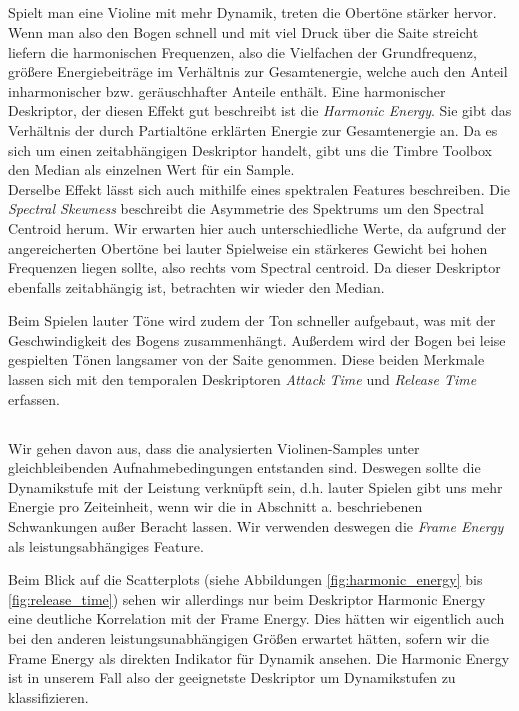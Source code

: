 \subsection{}
Spielt man eine Violine mit mehr Dynamik, treten die Obertöne stärker hervor.
Wenn man also den Bogen schnell und mit viel Druck über die Saite streicht liefern die harmonischen Frequenzen, also die Vielfachen der Grundfrequenz, größere Energiebeiträge im Verhältnis zur Gesamtenergie, welche auch den Anteil inharmonischer bzw. geräuschhafter Anteile enthält.  
Eine harmonischer Deskriptor, der diesen Effekt gut beschreibt ist die \textit{Harmonic Energy}.
Sie gibt das Verhältnis der durch Partialtöne erklärten Energie zur Gesamtenergie an.
Da es sich um einen zeitabhängigen Deskriptor handelt, gibt uns die Timbre Toolbox den Median als einzelnen Wert für ein Sample.\\ 
Derselbe Effekt lässt sich auch mithilfe eines spektralen Features beschreiben.
Die \textit{Spectral Skewness} beschreibt die Asymmetrie des Spektrums um den Spectral Centroid herum.
Wir erwarten hier auch unterschiedliche Werte, da aufgrund der angereicherten Obertöne bei lauter Spielweise ein stärkeres Gewicht bei hohen Frequenzen liegen sollte, also rechts vom Spectral centroid.
Da dieser Deskriptor ebenfalls zeitabhängig ist, betrachten wir wieder den Median.

Beim Spielen lauter Töne wird zudem der Ton schneller aufgebaut, was mit der Geschwindigkeit des Bogens zusammenhängt.
Außerdem wird der Bogen bei leise gespielten Tönen langsamer von der Saite genommen.
Diese beiden Merkmale lassen sich mit den temporalen Deskriptoren \textit{Attack Time} und \textit{Release Time} erfassen.

\subsection{}
Wir gehen davon aus, dass die analysierten Violinen-Samples unter gleichbleibenden Aufnahmebedingungen entstanden sind. 
Deswegen sollte die Dynamikstufe mit der Leistung verknüpft sein, d.h. lauter Spielen gibt uns mehr Energie pro Zeiteinheit, wenn wir die in Abschnitt a. beschriebenen Schwankungen außer Beracht lassen.
Wir verwenden deswegen die \textit{Frame Energy} als leistungsabhängiges Feature.

Beim Blick auf die Scatterplots (siehe Abbildungen \ref{fig:harmonic_energy} bis \ref{fig:release_time}) sehen wir allerdings nur beim Deskriptor Harmonic Energy eine deutliche Korrelation mit der Frame Energy. 
Dies hätten wir eigentlich auch bei den anderen leistungsunabhängigen Größen erwartet hätten, sofern wir die Frame Energy als direkten Indikator für Dynamik ansehen.
Die Harmonic Energy ist in unserem Fall also der geeignetste Deskriptor um Dynamikstufen zu klassifizieren.

